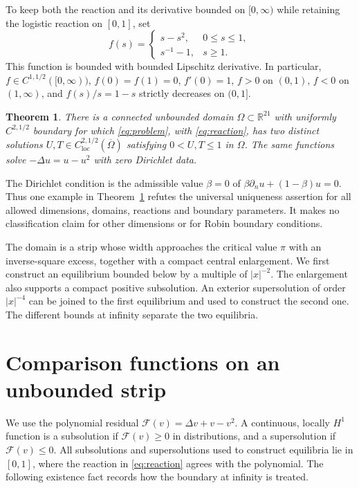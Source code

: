 \documentclass[11pt]{article}
\newtheorem{theorem}{Theorem}
\newcommand{\R}{\mathbb R}
\newcommand{\Om}{\Omega}
\newcommand{\F}{\mathcal F}
\begin{document}
To keep both the reaction and its derivative bounded on $[0,\infty)$
while retaining the logistic reaction on $[0,1]$, set
\begin{equation}\label{eq:reaction}
 f(s)=\begin{cases}s-s^2,&0\leq s\leq1,\\s^{-1}-1,&s\geq1.\end{cases}
\end{equation}
This function is bounded with bounded Lipschitz derivative. In particular,
$f\in C^{1,1/2}([0,\infty))$, $f(0)=f(1)=0$, $f'(0)=1$, $f>0$ on $(0,1)$,
$f<0$ on $(1,\infty)$, and $f(s)/s=1-s$ strictly decreases on $(0,1]$.

\begin{theorem}\label{thm:main}
There is a connected unbounded domain $\Om\subset\R^{21}$ with uniformly
$C^{2,1/2}$ boundary for which \eqref{eq:problem}, with \eqref{eq:reaction},
has two distinct solutions $U,T\in C^{2,1/2}_{\mathrm{loc}}(\overline\Om)$
satisfying $0<U,T\leq1$ in $\Om$.
The same functions solve $-\Delta u=u-u^2$ with zero Dirichlet data.
\end{theorem}

The Dirichlet condition is the admissible value $\beta=0$ of
$\beta\partial_nu+(1-\beta)u=0$. Thus one example in Theorem~\ref{thm:main}
refutes the universal uniqueness assertion for all allowed dimensions,
domains, reactions and boundary parameters. It makes no classification
claim for other dimensions or for Robin boundary conditions.

The domain is a strip whose width approaches the critical value $\pi$ with
an inverse-square excess, together with a compact central enlargement.
We first construct an equilibrium bounded below by a multiple of
$|x|^{-2}$. The enlargement also supports a compact positive subsolution.
An exterior supersolution of order $|x|^{-4}$ can be joined to the first
equilibrium and used to construct the second one. The different bounds at
infinity separate the two equilibria.

\section{Comparison functions on an unbounded strip}

We use the polynomial residual
$\F(v)=\Delta v+v-v^2$. A continuous, locally $H^1$ function is a subsolution
if $\F(v)\geq0$ in distributions, and a supersolution if $\F(v)\leq0$.
All subsolutions and supersolutions used to construct equilibria lie in
$[0,1]$, where the reaction in \eqref{eq:reaction} agrees with the polynomial.
The following existence fact records how the boundary at infinity is treated.
\end{document}
